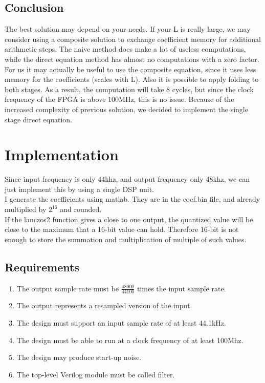 \documentclass[a4paper,twoside,11pt, fleqn]{article}
\begin{document}
\subsection{Conclusion}
The best solution may depend on your needs. If your L is really large, we may consider using a composite solution to exchange coefficient memory for additional arithmetic steps. The naive method does make a lot of useless computations, while the direct equation method has almost no computations with a zero factor.\\ 

For us it may actually be useful to use the composite equation, since it uses less memory for the coefficients (scales with L). Also it is possible to apply folding to both stages. As a result, the computation will take 8 cycles, but since the clock frequency of the FPGA is above 100MHz, this is no issue. Because of the increased complexity of previous solution, we decided to implement the single stage direct equation.\\


\newpage
\section{Implementation}
Since input frequency is only 44khz, and output frequency only 48khz, we can just implement this by using a single DSP unit.\\

I generate the coefficients using matlab. They are in the coef.bin file, and already multiplied by $2^{16}$ and rounded.\\

If the lanczos2 function gives a close to one output, the quantized value will be close to the maximum that a 16-bit value can hold. Therefore 16-bit is not enough to store the summation and multiplication of multiple of such values.\\

\subsection{Requirements}
\label{sec:req}

\begin{enumerate}
	\item The output sample rate must be $\frac{48000}{44100}$ times the input sample rate.
	\item The output represents a resampled version of the input.
	\item The design must support an input sample rate of at least 44.1kHz.
	\item The design must be able to run at a clock frequency of at least 100Mhz.
	\item The design may produce start-up noise.
	\item The top-level Verilog module must be called filter.
\end{enumerate}
\end{document}
